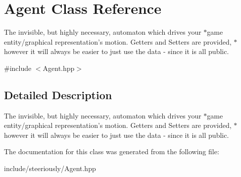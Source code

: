 \hypertarget{class_agent}{\section{Agent Class Reference}
\label{class_agent}
}


The invisible, but highly necessary, automaton which drives your $\ast$game entity/graphical representation's motion. Getters and Setters are provided, $\ast$however it will always be easier to just use the data -\/ since it is all public.  




{\ttfamily \#include $<$Agent.\-hpp$>$}



\subsection{Detailed Description}
The invisible, but highly necessary, automaton which drives your $\ast$game entity/graphical representation's motion. Getters and Setters are provided, $\ast$however it will always be easier to just use the data -\/ since it is all public. 

The documentation for this class was generated from the following file\-:\begin{DoxyCompactItemize}
\item 
include/steeriously/Agent.\-hpp\end{DoxyCompactItemize}
